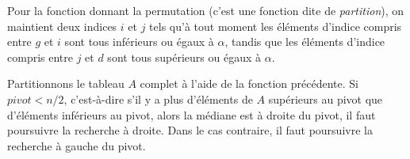 \Q
Pour la fonction donnant la permutation (c'est une fonction dite de \textit{partition}), on maintient deux indices $i$ et $j$ tels qu'à tout moment les éléments d'indice compris entre $g$ et $i$ sont tous inférieurs ou égaux à $\alpha$, tandis que les éléments d'indice compris entre $j$ et $d$ sont tous supérieurs ou égaux à $\alpha$.



\Q
Partitionnons le tableau $A$ complet à l'aide de la fonction précédente. Si $\textit{pivot}<n/2$, c'est-à-dire s'il y a plus d'éléments de $A$ supérieurs au pivot que d'éléments inférieurs au pivot, alors la médiane est à droite du pivot, il faut poursuivre la recherche à droite. Dans le cas contraire, il faut poursuivre la recherche à gauche du pivot.



\Fin
